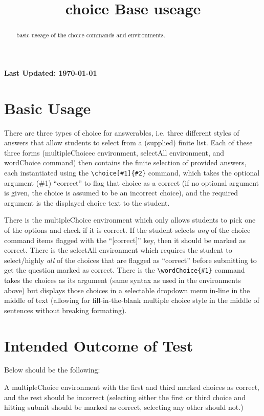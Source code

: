 \documentclass{ximera}
\title{choice Base useage}
\begin{document}
\begin{abstract}
    basic useage of the choice commands and environments.
\end{abstract}
\maketitle

{{\Huge \bfseries Last Updated: \today}} \\


\section{Basic Usage}
There are three types of choice for answerables, i.e. three different styles of answers that allow students to select from a (supplied) finite list.
Each of these three forms (multipleChoicec environment, selectAll environment, and wordChoice command) then contains the finite selection of provided answers, each instantiated
using the \verb|\choice[#1]{#2}| command, 
which takes the optional argument (\#1) ``correct'' to flag that choice as a correct 
(if no optional argument is given, the choice is assumed to be an incorrect choice), 
and the required argument is the displayed choice text to the student.

There is the multipleChoice environment which only allows students to pick one of the options and check if it is correct. If the student selects
\textit{any} of the choice command items flagged with the ``[correct]'' key, then it should be marked as correct.
There is the selectAll environment which requires the student to select/highly \textit{all} of the choices that are flagged as ``correct'' 
before submitting to get the question marked as correct.
There is the \verb|\wordChoice{#1}| command takes the choices as its argument (same syntax as used in the environments above) 
but displays those choices in a selectable dropdown menu in-line in the middle of text 
(allowing for fill-in-the-blank multiple choice style in the middle of sentences without breaking formating).

\section{Intended Outcome of Test}
Below should be the following:

A multipleChoice environment with the first and third marked choices as correct, and the rest should be incorrect 
(selecting either the first or third choice and hitting submit should be marked as correct, selecting any other should not.) 
\end{document}
